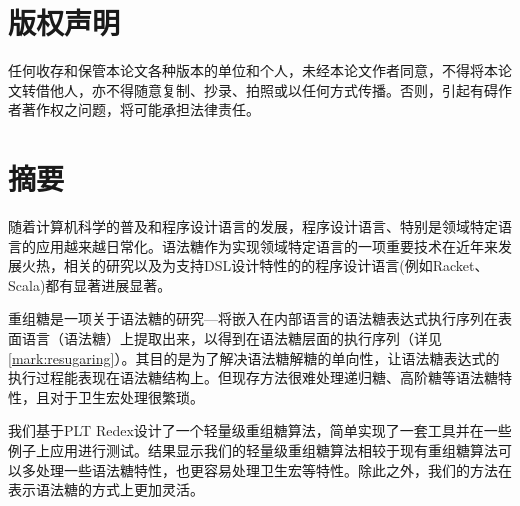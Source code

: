 \documentclass[UTF8,openany,AutoFakeBold,AutoFakeSlant,cs4size]{ctexbook}
\title{}
\author{}
\date{}
\begin{document}
\newcommand{\chineseTitle}{一种利用Redex实现重组糖的轻量级方法}
\newcommand{\englishTitle}{A Lightweight Resugaring Method using PLT Redex}
\newcommand{\name}{杨子毅}
\newcommand{\studentID}{1600011063}
\newcommand{\school}{信息科学技术学院}
\newcommand{\major}{软件工程}
\newcommand{\advisor}{胡振江}

\clearpage



\clearpage

\songti\linespread{1.5}\selectfont
\linespread{1.5}\selectfont
\chapter*{版权声明}
\setcounter{page}{0}
\thispagestyle{empty}
任何收存和保管本论文各种版本的单位和个人，未经本论文作者同意，不得将本论文转借他人，亦不得随意复制、抄录、拍照或以任何方式传播。否则，引起有碍作者著作权之问题，将可能承担法律责任。
\clearpage




\pagestyle{fancy}
\normalsize
\linespread{1.5}\selectfont



\chapter*{摘要}

{} %
随着计算机科学的普及和程序设计语言的发展，程序设计语言、特别是领域特定语言的应用越来越日常化。语法糖作为实现领域特定语言的一项重要技术在近年来发展火热，相关的研究以及为支持DSL设计特性的的程序设计语言(例如Racket、Scala)都有显著进展显著。

重组糖是一项关于语法糖的研究---将嵌入在内部语言的语法糖表达式执行序列在表面语言（语法糖）上提取出来，以得到在语法糖层面的执行序列（详见\ref{mark:resugaring}）。其目的是为了解决语法糖解糖的单向性，让语法糖表达式的执行过程能表现在语法糖结构上。但现存方法很难处理递归糖、高阶糖等语法糖特性，且对于卫生宏处理很繁琐。

我们基于PLT Redex设计了一个轻量级重组糖算法，简单实现了一套工具并在一些例子上应用进行测试。结果显示我们的轻量级重组糖算法相较于现有重组糖算法可以多处理一些语法糖特性，也更容易处理卫生宏等特性。除此之外，我们的方法在表示语法糖的方式上更加灵活。
\end{document}
